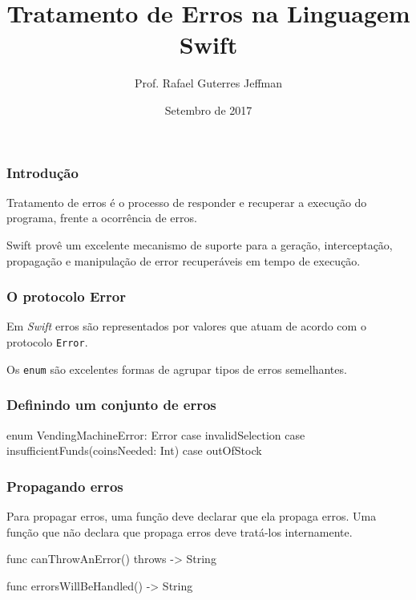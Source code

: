 



\title{Tratamento de Erros na Linguagem Swift}
\author{Prof. Rafael Guterres Jeffman}
\date{Setembro de 2017}



\coverframe

\begin{frame}
    \frametitle{Introdução}

    Tratamento de erros é o processo de responder e recuperar a execução
    do programa, frente a ocorrência de erros.

    \vspace{.7cm}

    Swift provê um excelente mecanismo de suporte para a geração,
    interceptação, propagação e manipulação de error recuperáveis em
    tempo de execução.
\end{frame}

\begin{frame}
    \frametitle{O protocolo Error}

    Em \textit{Swift} erros são representados por valores que atuam de
    acordo com o protocolo \texttt{Error}.

    \vspace{.7cm}

    Os {\color{green}\texttt{enum}} são excelentes formas de agrupar
    tipos de erros semelhantes.
\end{frame}

\begin{frame}[fragile]
    \frametitle{Definindo um conjunto de erros}

    \begin{swift}
    enum VendingMachineError: Error {
        case invalidSelection
        case insufficientFunds(coinsNeeded: Int)
        case outOfStock
    }
    \end{swift}

\end{frame}

\begin{frame}[fragile]
    \frametitle{Propagando erros}
    Para propagar erros, uma função deve declarar que ela propaga erros.
    \vspace{.7cm}
    Uma função que não declara que propaga erros deve tratá-los
    internamente.

    \begin{swift}
        func canThrowAnError() throws -> String

        func errorsWillBeHandled() -> String
    \end{swift}

\end{frame}

